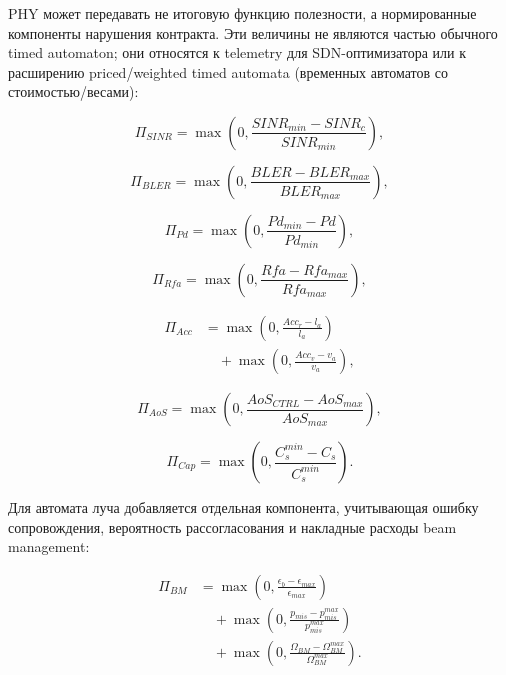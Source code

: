 \documentclass[12pt,a4paper]{article}
\begin{document}
PHY может передавать не итоговую функцию полезности, а нормированные компоненты нарушения контракта. Эти величины не являются частью обычного timed automaton; они относятся к telemetry для SDN-оптимизатора или к расширению priced/weighted timed automata (временных автоматов со стоимостью/весами):

\begin{equation}
\Pi_{SINR}=
\max\left(0,\frac{SINR_{min}-SINR_c}{SINR_{min}}\right),
\end{equation}

\begin{equation}
\Pi_{BLER}=
\max\left(0,\frac{BLER-BLER_{max}}{BLER_{max}}\right),
\end{equation}

\begin{equation}
\Pi_{Pd}=
\max\left(0,\frac{Pd_{min}-Pd}{Pd_{min}}\right),
\end{equation}

\begin{equation}
\Pi_{Rfa}=
\max\left(0,\frac{Rfa-Rfa_{max}}{Rfa_{max}}\right),
\end{equation}

\begin{equation}
\begin{aligned}
\Pi_{Acc}
&=
\max\left(0,\frac{Acc_r-l_a}{l_a}\right)\\
&\quad+
\max\left(0,\frac{Acc_v-v_a}{v_a}\right),
\end{aligned}
\end{equation}

\begin{equation}
\Pi_{AoS}=
\max\left(0,\frac{AoS_{CTRL}-AoS_{max}}{AoS_{max}}\right),
\end{equation}

\begin{equation}
\Pi_{Cap}=
\max\left(0,\frac{C_s^{min}-C_s}{C_s^{min}}\right).
\end{equation}

Для автомата луча добавляется отдельная компонента, учитывающая ошибку сопровождения, вероятность рассогласования и накладные расходы beam management:

\begin{equation}
\begin{aligned}
\Pi_{BM}
&=
\max\left(0,\frac{\epsilon_b-\epsilon_{max}}{\epsilon_{max}}\right)\\
&\quad+
\max\left(0,\frac{p_{mis}-p_{mis}^{max}}{p_{mis}^{max}}\right)\\
&\quad+
\max\left(0,\frac{\Omega_{BM}-\Omega_{BM}^{max}}{\Omega_{BM}^{max}}\right).
\end{aligned}
\end{equation}
\end{document}
